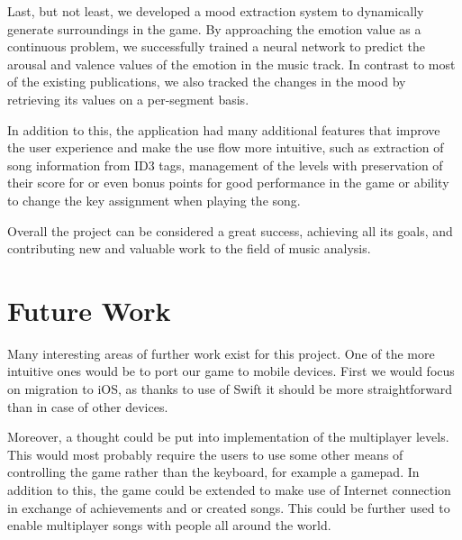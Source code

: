 Last, but not least, we developed a mood extraction system to dynamically generate surroundings in the game. By approaching the emotion value as a continuous problem, we successfully trained a neural network to predict the arousal and valence values of the emotion in the music track. In contrast to most of the existing publications, we also tracked the changes in the mood by retrieving its values on a per-segment basis.

In addition to this, the application had many additional features that improve the user experience and make the use flow more intuitive, such as extraction of song information from ID3 tags, management of the levels with preservation of their score for or even bonus points for good performance in the game or ability to change the key assignment when playing the song.

Overall the project can be considered a great success, achieving all its goals, and contributing new and valuable work to the field of music analysis.

\section{Future Work}

Many interesting areas of further work exist for this project. One of the more intuitive ones would be to port our game to mobile devices. First we would focus on migration to iOS, as thanks to use of Swift it should be more straightforward than in case of other devices. 

Moreover, a thought could be put into implementation of the multiplayer levels. This would most probably require the users to use some other means of controlling the game rather than the keyboard, for example a gamepad. In addition to this, the game could be extended to make use of Internet connection in exchange of achievements and or created songs. This could be further used to enable multiplayer songs with people all around the world. 